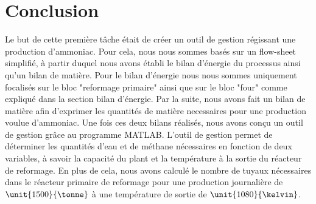\section{Conclusion}
Le but de cette première tâche était de créer un outil de gestion régissant une production d'ammoniac. 
Pour cela, nous nous sommes basés sur un flow-sheet simplifié, à partir duquel nous avons établi le bilan d'énergie du processus
ainsi qu'un bilan de matière. Pour le bilan d'énergie nous nous sommes uniquement focalisés sur le bloc "reformage primaire" ainsi
que sur le bloc "four" comme expliqué dans la section bilan d'énergie. Par la suite, nous avons fait un bilan de matière 
afin d'exprimer les quantités de matière necessaires pour une production voulue d'ammoniac. Une fois ces deux bilans 
réalisés, nous avons conçu un outil de gestion grâce au programme \textsc{MATLAB}. L'outil de gestion permet de déterminer les 
quantités d'eau et de méthane nécessaires en fonction de deux variables, à savoir la capacité du plant et la température à 
la sortie du réacteur de reformage. En plus de cela, nous avons calculé le nombre de tuyaux nécessaires dans le réacteur
primaire de reformage pour une production journalière de $\unit{1500}{\tonne}$ à une température de sortie de 
$\unit{1080}{\kelvin}$.
